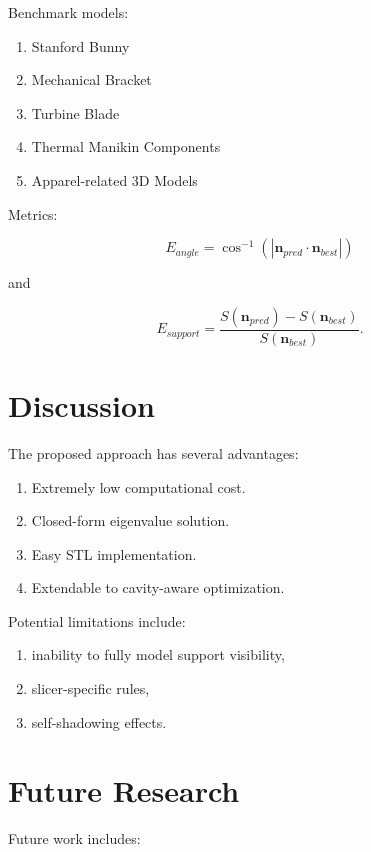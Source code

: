 \documentclass[journal,11pt]{article}
\begin{document}
Benchmark models:

\begin{enumerate}
\item Stanford Bunny
\item Mechanical Bracket
\item Turbine Blade
\item Thermal Manikin Components
\item Apparel-related 3D Models
\end{enumerate}

Metrics:

\begin{equation}
E_{angle}
=
\cos^{-1}
(|\mathbf n_{pred}\cdot\mathbf n_{best}|)
\end{equation}

and

\begin{equation}
E_{support}
=
\frac{
S(\mathbf n_{pred})
-
S(\mathbf n_{best})
}
{
S(\mathbf n_{best})
}.
\end{equation}

\section{Discussion}

The proposed approach has several advantages:

\begin{enumerate}
\item Extremely low computational cost.
\item Closed-form eigenvalue solution.
\item Easy STL implementation.
\item Extendable to cavity-aware optimization.
\end{enumerate}

Potential limitations include:

\begin{enumerate}
\item inability to fully model support visibility,
\item slicer-specific rules,
\item self-shadowing effects.
\end{enumerate}

\section{Future Research}

Future work includes:
\end{document}
